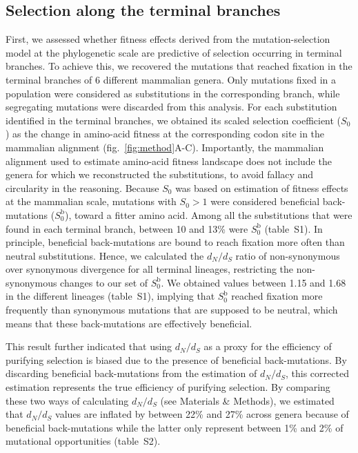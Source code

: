 \documentclass{article}
\newcommand{\dn}{d_N}
\newcommand{\ds}{d_S}
\newcommand{\dnds}{\dn / \ds}
\newcommand{\Sphy}{S_{0}}
\begin{document}
    \subsection*{Selection along the terminal branches}
    First, we assessed whether fitness effects derived from the mutation-selection model at the phylogenetic scale are predictive of selection occurring in terminal branches.
    To achieve this, we recovered the mutations that reached fixation in the terminal branches of 6 different mammalian genera.
    Only mutations fixed in a population were considered as substitutions in the corresponding branch, while segregating mutations were discarded from this analysis.
    For each substitution identified in the terminal branches, we obtained its scaled selection coefficient ($\Sphy$) as the change in amino-acid fitness at the corresponding codon site in the mammalian alignment (fig.~\ref{fig:method}A-C).
    Importantly, the mammalian alignment used to estimate amino-acid fitness landscape does not include the genera for which we reconstructed the substitutions, to avoid fallacy and circularity in the reasoning.
    Because $\Sphy$ was based on estimation of fitness effects at the mammalian scale, mutations with $\Sphy>1$ were considered beneficial back-mutations ($\Sphy^{\text{b}}$), toward a fitter amino acid.
    Among all the substitutions that were found in each terminal branch, between 10 and 13\% were $\Sphy^{\text{b}}$ (table~S1).
    In principle, beneficial back-mutations are bound to reach fixation more often than neutral substitutions.
    Hence, we calculated the $\dnds$ ratio of non-synonymous over synonymous divergence for all terminal lineages, restricting the non-synonymous changes to our set of $\Sphy^{\text{b}}$.
    We obtained values between 1.15 and 1.68 in the different lineages (table~S1), implying that $\Sphy^{\text{b}}$ reached fixation more frequently than synonymous mutations that are supposed to be neutral, which means that these back-mutations are effectively beneficial.

    This result further indicated that using $\dnds$ as a proxy for the efficiency of purifying selection is biased due to the presence of beneficial back-mutations.
    By discarding beneficial back-mutations from the estimation of $\dnds$, this corrected estimation represents the true efficiency of purifying selection.
    By comparing these two ways of calculating $\dnds$ (see Materials \& Methods), we estimated that $\dnds$ values are inflated by between 22\% and 27\% across genera because of beneficial back-mutations while the latter only represent between 1\% and 2\% of mutational opportunities (table~S2).
\end{document}
